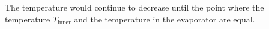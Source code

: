 The temperature would continue to decrease until the point where the temperature \( T_{\text{inner}} \) and the temperature in the evaporator are equal.